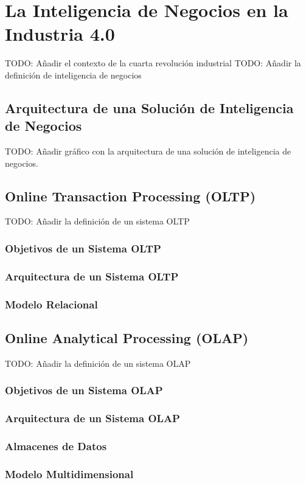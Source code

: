 \chapter{La Inteligencia de Negocios en la Industria 4.0}\label{chapter:bi-industry-4.0}
TODO: A\~nadir el contexto de la cuarta revoluci\'on industrial
TODO: A\~nadir la definici\'on de inteligencia de negocios

\section{Arquitectura de una Soluci\'on de Inteligencia de Negocios}

TODO: A\~nadir gr\'afico con la arquitectura de una soluci\'on de inteligencia
de negocios.

\section{Online Transaction Processing (OLTP)}
TODO: A\~nadir la definici\'on de un sistema OLTP
\subsection{Objetivos de un Sistema OLTP}
\subsection{Arquitectura de un Sistema OLTP}
\subsection{Modelo Relacional}

\section{Online Analytical Processing (OLAP)}
TODO: A\~nadir la definici\'on de un sistema OLAP
\subsection{Objetivos de un Sistema OLAP}
\subsection{Arquitectura de un Sistema OLAP}
\subsection{Almacenes de Datos}
\subsection{Modelo Multidimensional}
